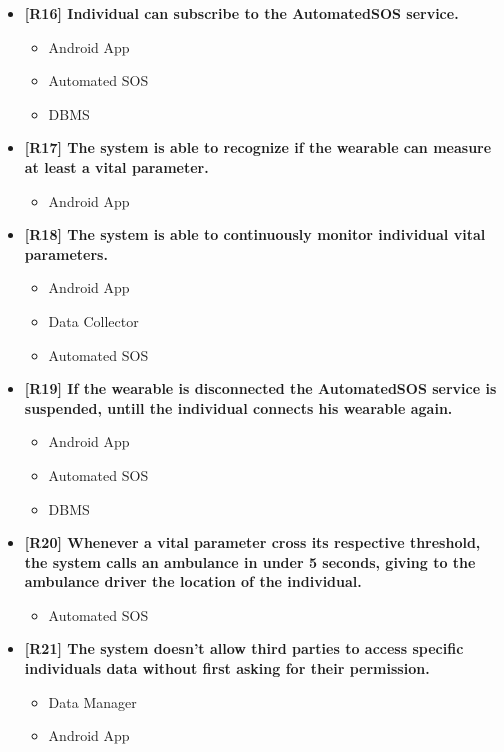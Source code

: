 \begin{itemize}
\item \textbf{[R16] Individual can subscribe to the AutomatedSOS service.}
\begin{itemize}
\item Android App
\item Automated SOS
\item DBMS
\end{itemize}


\item \textbf{[R17] The system is able to recognize if the wearable can measure at least a vital parameter.}
\begin{itemize}
\item Android App
\end{itemize}

\item \textbf{[R18] The system is able to continuously monitor individual vital parameters.}
\begin{itemize}
\item Android App
\item Data Collector
\item Automated SOS
\end{itemize}

\item \textbf{[R19] If the wearable is disconnected the AutomatedSOS service is suspended, untill the individual connects his wearable again.}
\begin{itemize}
\item Android App
\item Automated SOS
\item DBMS
\end{itemize}

\item \textbf{[R20] Whenever a vital parameter cross its respective threshold, the system calls an ambulance in under 5 seconds, giving to the ambulance driver the location of the individual.}
\begin{itemize}
\item Automated SOS
\end{itemize}

\item \textbf{[R21] The system doesn't allow third parties to access specific individuals data without first asking for their permission.}
\begin{itemize}
\item Data Manager
\item Android App
\end{itemize}


\end{itemize}
